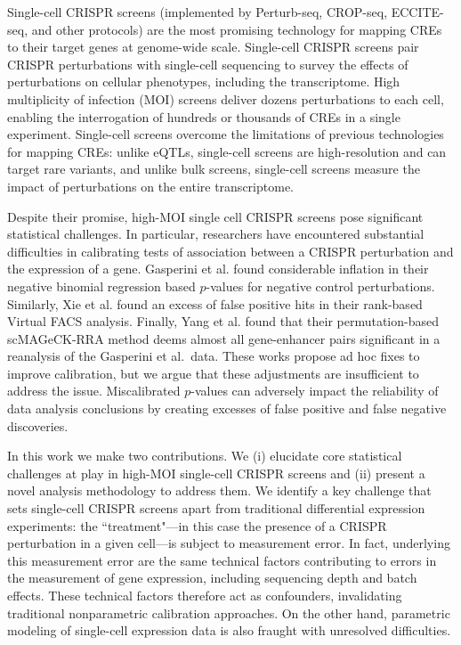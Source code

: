 \documentclass{article}
\begin{document}
Single-cell CRISPR screens (implemented by Perturb-seq\cite{Dixit2016, Adamson2016}, CROP-seq\cite{Datlinger2017}, ECCITE-seq\cite{Mimitou2019}, and other protocols) are the most promising technology for mapping CREs to their target genes at genome-wide scale. Single-cell CRISPR screens pair CRISPR perturbations with single-cell sequencing to survey the effects of perturbations on cellular phenotypes, including the transcriptome. High multiplicity of infection (MOI) screens deliver dozens perturbations to each cell\cite{Xie2017, Xie2019, Gasperini2019}, enabling the interrogation of hundreds or thousands of CREs in a single experiment. Single-cell screens overcome the limitations of previous technologies for mapping CREs\cite{Gasperini2019}: unlike eQTLs, single-cell screens are high-resolution and can target rare variants, and unlike bulk screens, single-cell screens measure the impact of perturbations on the entire transcriptome.

Despite their promise, high-MOI single cell CRISPR screens pose significant statistical challenges. In particular, researchers have encountered substantial difficulties in calibrating tests of association between a CRISPR perturbation and the expression of a gene. Gasperini et al.\cite{Gasperini2019} found considerable inflation in their negative binomial regression based $p$-values for negative control perturbations. Similarly, Xie et al.\cite{Xie2019} found an excess of false positive hits in their rank-based Virtual FACS analysis. Finally, Yang et al.\cite{Yang2020} found that their permutation-based scMAGeCK-RRA method deems almost all gene-enhancer pairs significant in a reanalysis of the Gasperini et al.\ data. These works propose ad hoc fixes to improve calibration, but we argue that these adjustments are insufficient to address the issue. Miscalibrated $p$-values can adversely impact the reliability of data analysis conclusions by creating excesses of false positive and false negative discoveries.

In this work we make two contributions. We (i) elucidate core statistical challenges at play in high-MOI single-cell CRISPR screens and (ii) present a novel analysis methodology to address them. We identify a key challenge that sets single-cell CRISPR screens apart from traditional differential expression experiments: the ``treatment"---in this case the presence of a CRISPR perturbation in a given cell---is subject to measurement error\cite{Dixit2016,Hill2018,Replogle2020}. In fact, underlying this measurement error are the same technical factors contributing to errors in the measurement of gene expression, including sequencing depth and batch effects. These technical factors therefore act as confounders, invalidating traditional nonparametric calibration approaches. On the other hand, parametric modeling of single-cell expression data is also fraught with unresolved difficulties. 
\end{document}

